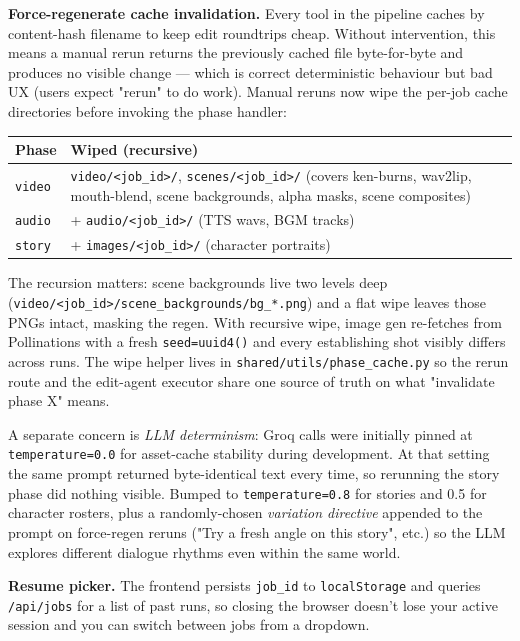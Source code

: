 \documentclass[11pt,a4paper]{article}
\newcommand{\code}[1]{\texttt{\small #1}}
\begin{document}
\textbf{Force-regenerate cache invalidation.} Every tool in the pipeline
caches by content-hash filename to keep edit roundtrips cheap. Without
intervention, this means a manual rerun returns the previously cached file
byte-for-byte and produces no visible change --- which is correct
deterministic behaviour but bad UX (users expect "rerun" to do work). Manual
reruns now wipe the per-job cache directories before invoking the phase
handler:

\begin{center}
\begin{tabularx}{\linewidth}{l X}
\toprule
\textbf{Phase} & \textbf{Wiped (recursive)} \\
\midrule
\code{video}    & \code{video/<job\_id>/}, \code{scenes/<job\_id>/} (covers ken-burns, wav2lip, mouth-blend, scene backgrounds, alpha masks, scene composites) \\
\code{audio}    & + \code{audio/<job\_id>/} (TTS wavs, BGM tracks) \\
\code{story}    & + \code{images/<job\_id>/} (character portraits) \\
\bottomrule
\end{tabularx}
\end{center}

\noindent The recursion matters: scene backgrounds live two levels deep
(\code{video/<job\_id>/scene\_backgrounds/bg\_*.png}) and a flat wipe leaves
those PNGs intact, masking the regen. With recursive wipe, image gen
re-fetches from Pollinations with a fresh \code{seed=uuid4()} and every
establishing shot visibly differs across runs. The wipe helper lives in
\code{shared/utils/phase\_cache.py} so the rerun route and the edit-agent
executor share one source of truth on what "invalidate phase X" means.

A separate concern is \emph{LLM determinism}: Groq calls were initially
pinned at \code{temperature=0.0} for asset-cache stability during development.
At that setting the same prompt returned byte-identical text every time, so
rerunning the story phase did nothing visible. Bumped to
\code{temperature=0.8} for stories and 0.5 for character rosters, plus a
randomly-chosen \emph{variation directive} appended to the prompt on
force-regen reruns ("Try a fresh angle on this story", etc.) so the LLM
explores different dialogue rhythms even within the same world.

\textbf{Resume picker.} The frontend persists \code{job\_id} to
\code{localStorage} and queries \code{/api/jobs} for a list of past runs, so
closing the browser doesn't lose your active session and you can switch
between jobs from a dropdown.
\end{document}
